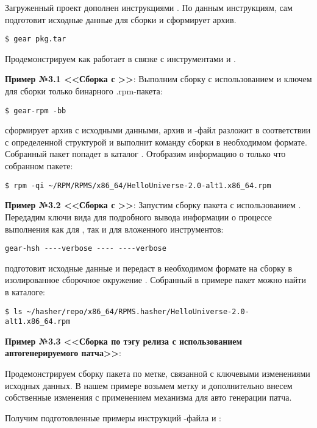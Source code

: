 Загруженный проект дополнен  инструкциями . По данным инструкциям,
 сам подготовит исходные данные для сборки и сформирует архив.
\begin{verbatim}
$ gear pkg.tar
\end{verbatim}

Продемонстрируем как  работает в связке с инструментами 
и .

\textbf{Пример №3.1 <<Сборка с >>}:
Выполним сборку с использованием  и ключем 
для сборки только бинарного {.rpm}-пакета:
\begin{verbatim}
$ gear-rpm -bb
\end{verbatim}

 сформирует архив с исходными данными, архив и -файл разложит в
соответствии с определенной структурой и выполнит команду сборки в необходимом формате.
Собранный пакет попадет в каталог . Отобразим информацию
о только что собранном пакете:
\begin{verbatim}
$ rpm -qi ~/RPM/RPMS/x86_64/HelloUniverse-2.0-alt1.x86_64.rpm
\end{verbatim}

\textbf{Пример №3.2 <<Сборка с >>}:
Запустим сборку пакета с использованием . Передадим ключи вида
 для подробного вывода информации о процессе выполнения
как для , так и для вложенного  инструментов:
\begin{verbatim}
gear-hsh ----verbose ---- ----verbose
\end{verbatim}

 подготовит исходные данные и передаст в необходимом формате на сборку в
изолированное сборочное окружение .
Собранный в примере пакет можно найти в каталоге:
\begin{verbatim}
$ ls ~/hasher/repo/x86_64/RPMS.hasher/HelloUniverse-2.0-alt1.x86_64.rpm
\end{verbatim}

\textbf{Пример №3.3 <<Сборка по тэгу релиза с использованием автогенерируемого патча>>}:

Продемонстрируем сборку пакета по метке, связанной с ключевыми изменениями исходных
данных. В нашем примере возьмем метку  и дополнительно внесем собственные
изменения с применением механизма  для авто генерации патча.

Получим подготовленные примеры инструкций -файла и :

